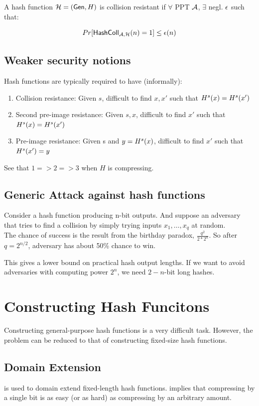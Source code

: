 \documentclass[12pt]{article}
\begin{document}
A hash function $\mathcal{H}=(\operatorname{\mathsf{Gen}}, H)$ is collision resistant if $\forall$ PPT  $\mathcal{A}$, $\exists$ negl. $\epsilon$ such that:

\begin{equation*}
Pr[\mathsf{HashColl}_{\mathcal{A},\mathcal{H}}(n)=1] \le \epsilon(n)
\end{equation*}
\newpage
\subsection{Weaker security notions}
Hash functions are typically required to have (informally):
\begin{enumerate}
\item Collision resistance: Given $s$, difficult to find $x,x'$ such that $H^s(x)=H^s(x')$
\item Second pre-image resistance: Given $s,x$, difficult to find $x'$ such that  $H^s(x)=H^s(x')$
\item Pre-image resistance: Given s and $y=H^s(x)$, difficult to find $x'$ such that $H^s(x')=y$
\end{enumerate}
See that $1=>2=>3$ when $H$ is compressing.
\subsection{Generic Attack against hash functions}
Consider a hash function producing n-bit outputs. And suppose an adversary that tries to find a collision by simply trying inputs $x_1,\dots,x_q$ at random.\\
The chance of success is the result from the birthday paradox, $\frac{q^2}{2*2^n}$. So after $q=2^{n/2}$, adversary has about 50\% chance to win.

This gives a lower bound on practical hash output lengths. If we want to avoid adversaries with computing power $2^n$, we need $2-n$-bit long hashes.

\section{Constructing Hash Funcitons}
Constructing general-purpose hash functions is a very difficult task. However, the problem can be reduced to that of constructing fixed-size hash functions.

\subsection{Domain Extension}
\mdt is used to domain extend fixed-length hash functions. 
\mdt implies that compressing by a single bit is as easy (or as hard) as compressing by an arbitrary amount.
\end{document}
